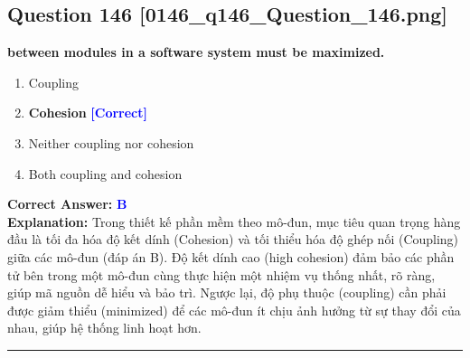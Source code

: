 \documentclass[11pt,a4paper]{article}
\begin{document}
\begin{minipage}{\textwidth}
\subsection*{Question 146 \quad \footnotesize{[0146\_q146\_Question\_146.png]}}
\noindent \textbf{between modules in a software system must be maximized.}

\begin{enumerate}[label=\Alph*.]
    \item Coupling
    \item \textbf{Cohesion} \hfill \textcolor{blue}{\textbf{[Correct]}}
    \item Neither coupling nor cohesion
    \item Both coupling and cohesion
\end{enumerate}

\noindent \textbf{Correct Answer:} \textcolor{blue}{\textbf{B}} \\[2pt]
\noindent \textbf{Explanation:} Trong thiết kế phần mềm theo mô-đun, mục tiêu quan trọng hàng đầu là tối đa hóa độ kết dính (Cohesion) và tối thiểu hóa độ ghép nối (Coupling) giữa các mô-đun (đáp án B). Độ kết dính cao (high cohesion) đảm bảo các phần tử bên trong một mô-đun cùng thực hiện một nhiệm vụ thống nhất, rõ ràng, giúp mã nguồn dễ hiểu và bảo trì. Ngược lại, độ phụ thuộc (coupling) cần phải được giảm thiểu (minimized) để các mô-đun ít chịu ảnh hưởng từ sự thay đổi của nhau, giúp hệ thống linh hoạt hơn.

\par\vspace{0.3cm}
\hrule
\vspace{0.3cm}
\end{minipage}
\end{document}
